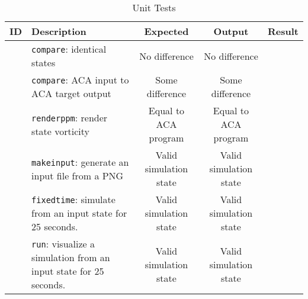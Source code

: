 
\newcommand{\testsuccess}{\cmark{}}
\newcommand{\testfail}{\xmark{}}


\begin{sidewaystable}
    \centering
    \begin{tabular}{ll|c|c|c}
        ID & Description & Expected & Output & Result \\
        \hline
        \newtest{}\label{test:unit:compare:identical} & \texttt{compare}: identical states & No difference & No difference & \testsuccess{} \\
        \newtest{}\label{test:unit:compare:different} & \texttt{compare}: ACA input to ACA target output & Some difference & Some difference & \testsuccess{} \\
        \newtest{}\label{test:unit:renderppm} & \texttt{renderppm}: render state vorticity & Equal to ACA program & Equal to ACA program & \testsuccess{} \\
        \newtest{}\label{test:unit:makeinput} & \texttt{makeinput}: generate an input file from a PNG & Valid simulation state & Valid simulation state & \testsuccess{} \\
        \newtest{}\label{test:unit:fixedtime} & \texttt{fixedtime}: simulate from an input state for 25 seconds. & Valid simulation state & Valid simulation state & \testsuccess{} \\
        \newtest{}\label{test:unit:run} & \texttt{run}: visualize a simulation from an input state for 25 seconds. & Valid simulation state & Valid simulation state & \testsuccess{} \\
    \end{tabular}
    \caption{Unit Tests}
    \label{tab:unittests}
\end{sidewaystable}
